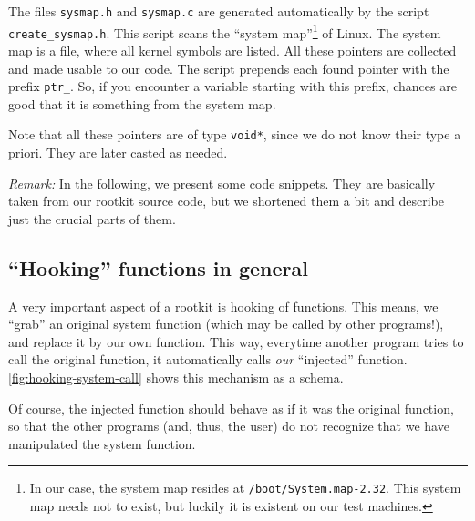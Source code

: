 \documentclass[10pt, letterpaper]{article}
\begin{document}
The files \texttt{sysmap.h} and \texttt{sysmap.c} are generated automatically by the script \linebreak \texttt{create\_sysmap.h}. This script scans the ``system map''\footnote{In our case, the system map resides at \texttt{/boot/System.map-2.32}. This system map needs not to exist, but luckily it is existent on our test machines.} of Linux. The system map is a file, where all kernel symbols are listed. All these pointers are collected and made usable to our code. The script prepends each found pointer with the prefix \texttt{ptr\_}. So, if you encounter a variable starting with this prefix, chances are good that it is something from the system map.

Note that all these pointers are of type \texttt{void*}, since we do not know their type a priori. They are later casted as needed.

\emph{Remark:} In the following, we present some code snippets. They are basically taken from our rootkit source code, but we shortened them a bit and describe just the crucial parts of them.

\subsection{``Hooking'' functions in general}

A very important aspect of a rootkit is hooking of functions. This means, we ``grab'' an original system function (which may be called by other programs!), and replace it by our own function. This way, everytime another program tries to call the original function, it automatically calls \emph{our} ``injected'' function. \autoref{fig:hooking-system-call} shows this mechanism as a schema.

Of course, the injected function should behave as if it was the original function, so that the other programs (and, thus, the user) do not recognize that we have manipulated the system function.
\end{document}

